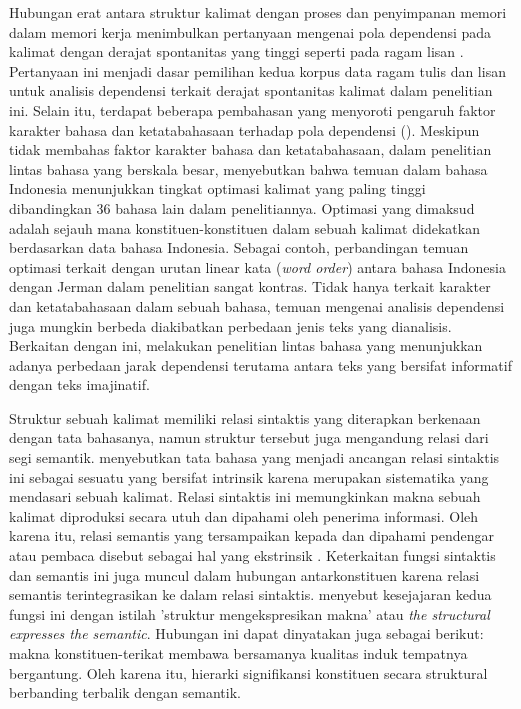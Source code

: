 Hubungan erat antara struktur kalimat dengan proses dan penyimpanan memori dalam memori kerja menimbulkan pertanyaan mengenai pola dependensi pada kalimat dengan derajat spontanitas yang tinggi seperti pada ragam lisan \citep{abney1991memory}. Pertanyaan ini menjadi dasar  pemilihan kedua korpus data ragam tulis dan lisan untuk analisis dependensi terkait derajat spontanitas kalimat dalam penelitian ini. Selain itu, terdapat beberapa pembahasan yang menyoroti pengaruh faktor karakter bahasa dan ketatabahasaan terhadap pola dependensi (\citealp{hawkins2014cross, jiang2015effects, wang2017effects}). Meskipun tidak membahas faktor karakter bahasa dan ketatabahasaan, dalam penelitian lintas bahasa yang berskala besar, \cite{futrell2015large} menyebutkan bahwa temuan dalam bahasa Indonesia menunjukkan tingkat optimasi kalimat yang paling tinggi dibandingkan 36 bahasa lain dalam penelitiannya. Optimasi yang dimaksud adalah sejauh mana konstituen-konstituen dalam sebuah kalimat didekatkan berdasarkan data bahasa Indonesia. Sebagai contoh, perbandingan temuan optimasi terkait dengan urutan linear kata (\textit{word order}) antara bahasa Indonesia dengan Jerman dalam penelitian \cite{futrell2015large} sangat kontras. Tidak hanya terkait karakter dan ketatabahasaan dalam sebuah bahasa, temuan mengenai analisis dependensi juga mungkin berbeda diakibatkan perbedaan jenis teks yang dianalisis. Berkaitan dengan ini, \cite{wang2017effects} melakukan penelitian lintas bahasa yang menunjukkan adanya perbedaan jarak dependensi terutama antara teks yang bersifat informatif dengan teks imajinatif.

Struktur sebuah kalimat memiliki relasi sintaktis yang diterapkan berkenaan dengan tata bahasanya, namun struktur tersebut juga mengandung relasi dari segi semantik. \cite{tesniere1959elements} menyebutkan tata bahasa yang menjadi ancangan relasi sintaktis ini sebagai sesuatu yang bersifat intrinsik karena merupakan sistematika yang mendasari sebuah kalimat. Relasi sintaktis ini memungkinkan makna sebuah kalimat diproduksi secara utuh dan dipahami oleh penerima informasi. Oleh karena itu, relasi semantis yang tersampaikan kepada dan dipahami pendengar atau pembaca disebut sebagai hal yang ekstrinsik \citep{tesniere1959elements}. Keterkaitan fungsi sintaktis dan semantis ini juga muncul dalam hubungan antarkonstituen karena relasi semantis terintegrasikan ke dalam relasi sintaktis. \cite{tesniere1959elements} menyebut kesejajaran kedua fungsi ini dengan istilah 'struktur mengekspresikan makna' atau \textit{the structural expresses the semantic}. Hubungan ini dapat dinyatakan juga sebagai berikut: makna \gls{konstituen-terikat} membawa bersamanya kualitas induk tempatnya bergantung. Oleh karena itu, hierarki signifikansi konstituen secara struktural berbanding terbalik dengan semantik.


